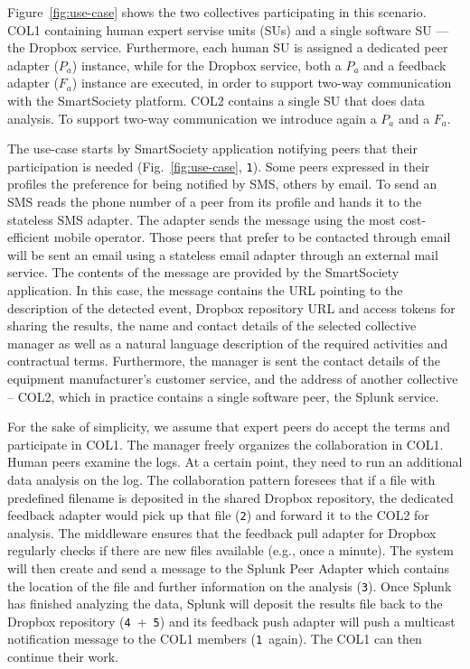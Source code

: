     
    Figure~\ref{fig:use-case} shows the two collectives participating in this scenario. COL1 containing human expert servise units (SUs) and a single software SU --- the Dropbox service. Furthermore, each human SU is assigned a dedicated peer adapter ($P_a$) instance, while for the Dropbox service, both a $P_a$ and a feedback adapter ($F_a$) instance are executed, in order to support two-way communication with the SmartSociety platform. COL2 contains a single SU that does data analysis. To support two-way communication we introduce again a $P_a$ and a $F_a$.

    The use-case starts by SmartSociety application notifying peers that their participation is needed (Fig.~\ref{fig:use-case}, \texttt{1}\degree). Some peers expressed in their profiles the preference for being notified by SMS, others by email. To send an SMS \mdl{} reads the phone number of a peer from its profile and hands it to the stateless SMS adapter. The adapter sends the message using the most cost-efficient mobile operator. Those peers that prefer to be contacted through email will be sent an email using a stateless email adapter through an external mail service.
    The contents of the message are provided by the SmartSociety application. In this case, the message contains the URL pointing to the description of the detected event, Dropbox repository URL and access tokens for sharing the results, the name and contact details of the selected collective manager as well as a natural language description of the required activities and contractual terms. Furthermore, the manager is sent the contact details of the equipment manufacturer's customer service, and the address of another collective -- COL2, which in practice contains a single software peer, the Splunk service.
    
    For the sake of simplicity, we assume that expert peers do accept the terms and participate in COL1. The manager freely organizes the collaboration in COL1. Human peers examine the logs. At a certain point, they need to run an additional data analysis on the log. The collaboration pattern foresees that if a file with predefined filename is deposited in the shared Dropbox repository, the dedicated feedback adapter would pick up that file (\texttt{2}\degree) and forward it to the COL2 for analysis. The middleware ensures that the feedback pull adapter for Dropbox regularly checks if there are new files available (e.g., once a minute).
	  The system will then create and send a message to the Splunk Peer Adapter which contains the location of the file and further information on the analysis (\texttt{3}\degree). Once Splunk has finished analyzing the data, Splunk will deposit the results file back to the Dropbox repository (\texttt{4}\degree~+~\texttt{5}\degree) and its feedback push adapter will push a multicast notification message to the COL1 members (\texttt{1}\degree~again). The COL1 can then continue their work.

